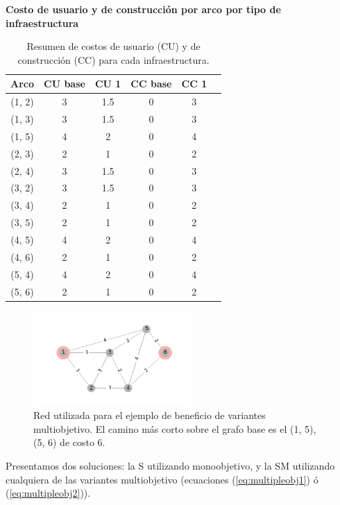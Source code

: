 \documentclass{article}
\begin{document}
  \begin{table}[h!]
    \centering
      \caption*{{\bf Costo de usuario y de construcción por arco por tipo de infraestructura}}
    \begin{tabular}{cccccc}
      \toprule
      Arco & CU base & CU 1 & CC base & CC 1 & \\
      \midrule
        (1, 2) & 3 & 1.5 & 0 & 3 \\
        (1, 3) & 3 & 1.5 & 0 & 3 \\
        (1, 5) & 4 & 2   & 0 & 4 \\
        (2, 3) & 2 & 1   & 0 & 2 \\
        (2, 4) & 3 & 1.5 & 0 & 3 \\
        (3, 2) & 3 & 1.5 & 0 & 3 \\
        (3, 4) & 2 & 1   & 0 & 2 \\
        (3, 5) & 2 & 1   & 0 & 2 \\
        (4, 5) & 4 & 2   & 0 & 4 \\
        (4, 6) & 2 & 1   & 0 & 2 \\
        (5, 4) & 4 & 2   & 0 & 4 \\
        (5, 6) & 2 & 1   & 0 & 2 \\
      \bottomrule
    \end{tabular}
      \caption{Resumen de costos de usuario (CU) y de construcción (CC) para cada infraestructura.}\label{table:example2arccosts}
  \end{table}

  \begin{figure}[h!]
    \centering
    \includegraphics[width=6cm]{../resources/example_2_base.png}
      \caption{Red utilizada para el ejemplo de beneficio de variantes multiobjetivo. El camino más corto sobre el grafo base es el (1, 5), (5, 6) de costo 6.}
    \label{fig:example2base}
  \end{figure}

  \FloatBarrier

  Presentamos dos soluciones: la S utilizando monoobjetivo, y la SM utilizando cualquiera de las variantes multiobjetivo (ecuaciones (\ref{eq:multipleobj1}) ó (\ref{eq:multipleobj2})).
\end{document}
